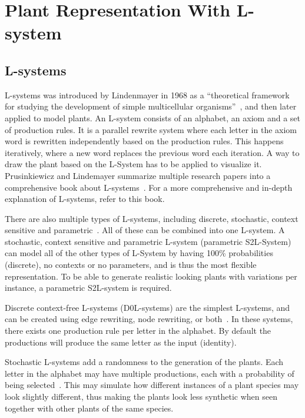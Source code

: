 \chapter{Plant Representation With L-system}

\section{L-systems}
L-systems was introduced by Lindenmayer in 1968 as a ``theoretical framework for studying the development of simple multicellular organisms''~\cite{Prusinkiewicz2012}, and then later applied to model plants.
An L-system consists of an alphabet, an axiom and a set of production rules.
It is a parallel rewrite system where each letter in the axiom word is rewritten independently based on the production rules.
This happens iteratively, where a new word replaces the previous word each iteration.
A way to draw the plant based on the L-System has to be applied to visualize it.
Prusinkiewicz and Lindemayer summarize multiple research papers into a comprehensive book about L-systems~\cite{Prusinkiewicz2012}.
For a more comprehensive and in-depth explanation of L-systems, refer to this book.

There are also multiple types of L-systems, including discrete, stochastic, context sensitive and parametric~\cite{Prusinkiewicz2012}.
All of these can be combined into one L-system.
A stochastic, context sensitive and parametric L-system (parametric S2L-System) can model all of the other types of L-System by having 100\% probabilities (discrete), no contexts or no parameters, and is thus the most flexible representation.
To be able to generate realistic looking plants with variations per instance, a parametric S2L-system is required.

Discrete context-free L-systems (D0L-systems) are the simplest L-systems, and can be created using edge rewriting, node rewriting, or both~\cite{Prusinkiewicz2012}.
In these systems, there exists one production rule per letter in the alphabet.
By default the productions will produce the same letter as the input (identity).

Stochastic L-systems add a randomness to the generation of the plants.
Each letter in the alphabet may have multiple productions, each with a probability of being selected~\cite{Prusinkiewicz2012}.
This may simulate how different instances of a plant species may look slightly different, thus making the plants look less synthetic when seen together with other plants of the same species.


